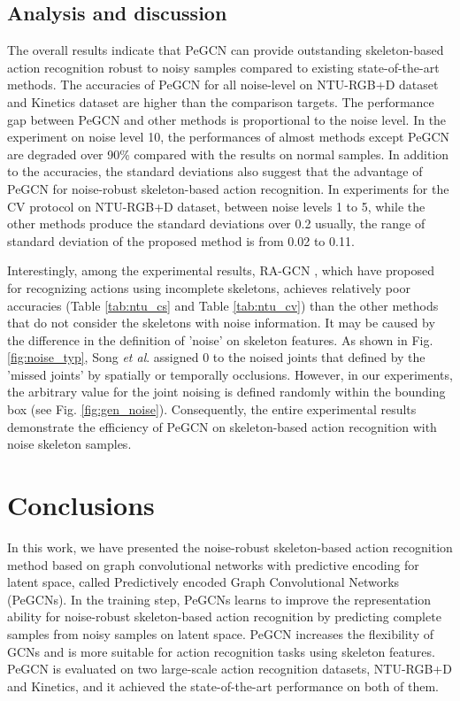 \documentclass[runningheads]{llncs}
\newcommand{\etal}{\textit{et al}. }
\begin{document}
\subsection{Analysis and discussion}
The overall results indicate that PeGCN can provide outstanding skeleton-based action recognition robust to noisy samples compared to existing state-of-the-art methods. The accuracies of PeGCN for all noise-level on NTU-RGB+D dataset and Kinetics dataset are higher than the comparison targets. The performance gap between PeGCN and other methods is proportional to the noise level. In the experiment on noise level 10, the performances of almost methods except PeGCN are degraded over 90\% compared with the results on normal samples. In addition to the accuracies, the standard deviations also suggest that the advantage of PeGCN for noise-robust skeleton-based action recognition. In experiments for the CV protocol on NTU-RGB+D dataset, between noise levels 1 to 5, while the other methods produce the standard deviations over 0.2 usually, the range of standard deviation of the proposed method is from 0.02 to 0.11.

Interestingly, among the experimental results, RA-GCN \cite{song2019richly}, which have proposed for recognizing actions using incomplete skeletons, achieves relatively poor accuracies (Table \ref{tab:ntu_cs} and Table \ref{tab:ntu_cv}) than the other methods \cite{shi2019two,yan2018spatial,shi2019skeleton} that do not consider the skeletons with noise information. It may be caused by the difference in the definition of 'noise' on skeleton features. 
As shown in Fig. \ref{fig:noise_typ}, Song \etal \cite{song2019richly} assigned 0 to the noised joints that defined by the 'missed joints' by spatially or temporally occlusions.  However, in our experiments, the arbitrary value for the joint noising is defined randomly within the bounding box (see Fig. \ref{fig:gen_noise}). Consequently, the entire experimental results demonstrate the efficiency of PeGCN on skeleton-based action recognition with noise skeleton samples. 

\section{Conclusions}\label{sec:5}
In this work, we have presented the noise-robust skeleton-based action recognition method based on graph convolutional networks with predictive encoding for latent space, called Predictively encoded Graph Convolutional Networks (PeGCNs). In the training step, PeGCNs learns to improve the representation ability for noise-robust skeleton-based action recognition by predicting complete samples from noisy samples on latent space. PeGCN increases the flexibility of GCNs and is more suitable for action recognition tasks using skeleton features. PeGCN is evaluated on two large-scale action recognition datasets, NTU-RGB+D and Kinetics, and it achieved the state-of-the-art performance on both of them.
\end{document}
